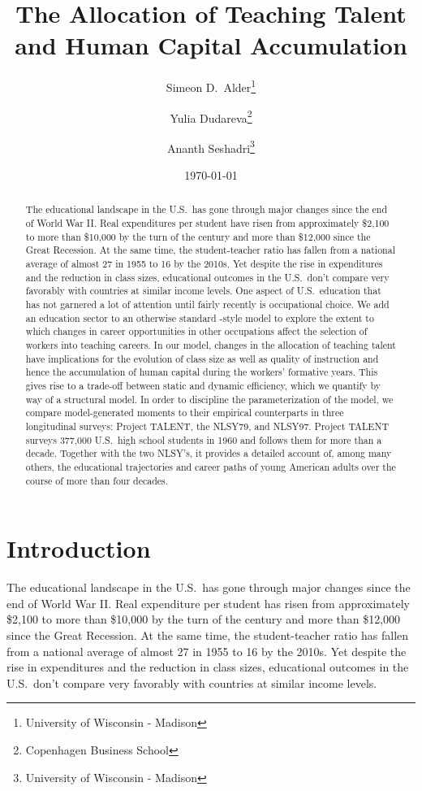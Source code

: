 \documentclass[onehalfspacing,11pt]{article}
\begin{document}
	
	\begin{titlepage}
		\title{The Allocation of Teaching Talent and Human Capital Accumulation}
		\author{Simeon D.~Alder\footnote{University of Wisconsin - Madison} \and Yulia Dudareva\footnote{Copenhagen Business School} \and Ananth Seshadri\footnote{University of Wisconsin - Madison}}
		\date{\today}
		
		\maketitle
		
		\begin{abstract}
			The educational landscape in the U.S.~has gone through major changes since the end of World War II. Real expenditures per student have risen from approximately \$2,100 to more than \$10,000 by the turn of the century and more than \$12,000 since the Great Recession. At the same time, the student-teacher ratio has fallen from a national average of almost 27 in 1955 to 16 by the 2010s. Yet despite the rise in expenditures and the reduction in class sizes, educational outcomes in the U.S.~don't compare very favorably with countries at similar income levels. One aspect of U.S.~education that has not garnered a lot of attention until fairly recently is occupational choice. We add an education sector to an otherwise standard \cite{Hsieh:2019}-style model to explore the extent to which changes in career opportunities in other occupations affect the selection of workers into teaching careers. In our model, changes in the allocation of teaching talent have implications for the evolution of class size as well as quality of instruction and hence the accumulation of human capital during the workers' formative years. This gives rise to a trade-off between static and dynamic efficiency, which we quantify by way of a structural model. In order to discipline the parameterization of the model, we compare model-generated moments to their empirical counterparts in three longitudinal surveys: Project TALENT, the NLSY79, and NLSY97. Project TALENT surveys 377,000 U.S.~high school students in 1960 and follows them for more than a decade. Together with the two NLSY's, it provides a detailed account of, among many others, the educational trajectories and career paths of young American adults over the course of more than four decades.
		\end{abstract}
	\end{titlepage}
	
	\section{Introduction}
	The educational landscape in the U.S.~has gone through major changes since the end of World War II. Real expenditure per student has risen from approximately \$2,100 to more than \$10,000 by the turn of the century and more than \$12,000 since the Great Recession. At the same time, the student-teacher ratio has fallen from a national average of almost 27 in 1955 to 16 by the 2010s. Yet despite the rise in expenditures and the reduction in class sizes, educational outcomes in the U.S.~don't compare very favorably with countries at similar income levels.
	
\end{document}
